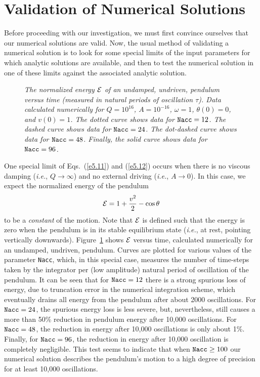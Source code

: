\section{Validation of Numerical Solutions}
Before proceeding with our investigation, we must first convince ourselves that 
our numerical solutions are valid. Now, the usual
method of validating a numerical solution is to look for some special limits of the input parameters for
which analytic solutions are available, and then to test the numerical
solution in one of these limits against the associated  analytic solution.

\begin{figure}
\epsfysize=3in
\centerline{}
\caption{\em The normalized energy ${\cal E}$ of an undamped, undriven,
pendulum versus time (measured in 
natural periods of oscillation $\tau$). Data calculated numerically for
$Q=10^{16}$, $A=10^{-16}$, $\omega=1$, $\theta(0)=0$, and $v(0)=1$. The
dotted curve shows data for ${\tt Nacc}=12$. The dashed curve
shows data for ${\tt Nacc} = 24$. The dot-dashed curve
shows data for ${\tt Nacc} = 48$. Finally, the solid curve shows data
for  ${\tt Nacc} = 96$.}\label{f16}
\end{figure}

 One special limit of
Eqs.~(\ref{e5.11}) and (\ref{e5.12}) occurs when there is no viscous damping ({\em i.e.}, $Q\rightarrow
\infty$) and no external driving ({\em i.e.}, $A\rightarrow 0$). In this case, we expect the
normalized energy of the pendulum
\begin{equation}
{\cal E} = 1 + \frac{v^2}{2} - \cos\theta
\end{equation}
to be a {\em constant} of the motion. Note that ${\cal E}$ is defined such that the energy is
zero when the pendulum is in its stable equilibrium state ({\em i.e.}, at rest, pointing
vertically downwards). Figure~\ref{f16} shows ${\cal E}$ versus time, calculated
numerically for an undamped, undriven, pendulum. Curves are plotted
for various values of the parameter {\tt Nacc}, which, in this special case, measures the number
of time-steps taken by the integrator per (low amplitude) natural period of oscillation of the pendulum.
It can be seen that for ${\tt Nacc}=12$ there is a strong spurious loss of energy, due 
to truncation error in the numerical integration scheme, which eventually drains all
energy from the pendulum after about 2000 oscillations. For ${\tt Nacc}=24$, the spurious
 energy loss is less severe, but, nevertheless, still causes a more than 50\% reduction in
pendulum energy after 10,000 oscillations. For ${\tt Nacc}=48$, the reduction in energy
after 10,000 oscillations is only about 1\%. Finally, for ${\tt Nacc}=96$, the reduction in
energy after 10,000 oscillation is completely negligible. This test seems to indicate
that when ${\tt Nacc}\geq 100$ our numerical solution describes the pendulum's 
motion  to
a high degree of precision for at least 10,000 oscillations.

